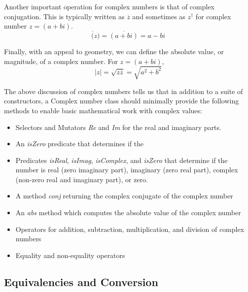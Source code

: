 \documentclass[10pt]{article}
\begin{document}
Another important operation for complex numbers is that of complex conjugation. This is typically written as $\overline{z}$ and sometimes as $z^\dagger$ for complex number $z=(a+bi)$.  
\begin{equation}
\overline(z) = \overline{(a+bi)} = a - bi
\end{equation}


Finally, with an appeal to geometry, we can define the absolute value, or magnitude, of a complex number. For $z=(a+bi)$,
\begin{equation}
|z| = \sqrt{z\overline{z}} = \sqrt{a^2 + b^2}
\end{equation}

The above discussion of complex numbers tells us that in addition to a suite of constructors, a Complex number class should minimally provide the following methods to enable basic mathematical work with complex values:
\begin{itemize}
\item Selectors and Mutators \textit{Re} and \textit{Im} for the real and imaginary parts.
\item An \textit{isZero} predicate that determines if the 
\item Predicates \textit{isReal}, \textit{isImag}, \textit{isComplex}, and \textit{isZero} that determine if the number is real (zero imaginary part), imaginary (zero real part), complex (non-zero real and imaginary part), or zero.
\item A method \textit{conj} returning the complex conjugate of the complex number
\item An \textit{abs} method which computes the absolute value of the complex number
\item Operators for addition, subtraction, multiplication, and division of complex numbers
\item Equality and non-equality operators
\end{itemize}

\subsection{Equivalencies and Conversion}
\end{document}
